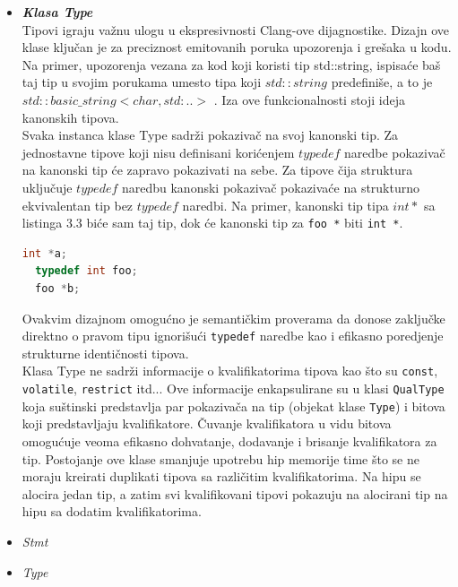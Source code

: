 \documentclass[12pt,oneside]{memoir}
\begin{document}
\begin{itemize}
  \item \textit{\textbf{Klasa Type}} \\ Tipovi igraju va\v{z}nu ulogu u ekspresivnosti Clang-ove dijagnostike. Dizajn ove klase klju\v{c}an je za preciznost emitovanih poruka upozorenja i gre\v{s}aka u kodu. Na primer, upozorenja vezana za kod koji koristi tip std::string, ispisa\'{c}e ba\v{s} taj tip u svojim porukama umesto tipa koji $std::string$ predefini\v{s}e, a to je $std::basic\_string<char, std:.. >$ . Iza ove funkcionalnosti stoji ideja kanonskih tipova.
  \\
  \indent
  Svaka instanca klase Type sadr\v{z}i pokaziva\v{c} na svoj kanonski tip. Za jednostavne tipove koji nisu definisani kori\'{c}enjem $typedef$ naredbe pokaziva\v{c} na kanonski tip \'{c}e zapravo pokazivati na sebe. Za tipove \v{c}ija struktura uklju\v{c}uje $typedef$ naredbu kanonski pokaziva\v{c} pokaziva\'{c}e na strukturno ekvivalentan tip bez $typedef$ naredbi.
  Na primer, kanonski tip tipa $int *$ sa listinga 3.3 bi\'{c}e sam taj tip, dok \'{c}e kanonski tip za \texttt{foo *} biti \texttt{int *}.
\begin{lstlisting}[caption={Demonstracija kanonskih tipova},label={lst:label},language=C++, captionpos=b]
  int *a;
  typedef int foo;
  foo *b;
\end{lstlisting}
  Ovakvim dizajnom omogu\'{c}no je semanti\v{c}kim proverama da donose zaklju\v{c}ke direktno o pravom tipu ignori\v{s}u\'{c}i \texttt{typedef} naredbe kao i efikasno poredjenje strukturne identi\v{c}nosti tipova.
  \def\code#1{\texttt{#1}}
  \\
  \indent
  Klasa Type ne sadr\v{z}i informacije o kvalifikatorima tipova kao \v{s}to su \code{const}, \code{volatile}, \code{restrict} itd... Ove informacije enkapsulirane su u klasi \code{QualType} koja su\v{s}tinski predstavlja par pokaziva\v{c}a na tip (objekat klase \code{Type}) i bitova koji predstavljaju
  kvalifikatore. \v{C}uvanje kvalifikatora u vidu bitova omogu\'{c}uje veoma efikasno dohvatanje, dodavanje i brisanje kvalifikatora za tip. Postojanje ove klase smanjuje upotrebu hip memorije time \v{s}to se ne moraju kreirati duplikati tipova sa razli\v{c}itim kvalifikatorima. Na hipu se alocira jedan tip, a zatim 
  svi kvalifikovani tipovi pokazuju na alocirani tip na hipu sa dodatim kvalifikatorima.

  \item \textit{Stmt}
  \item \textit{Type}
\end{itemize}
\end{document}
